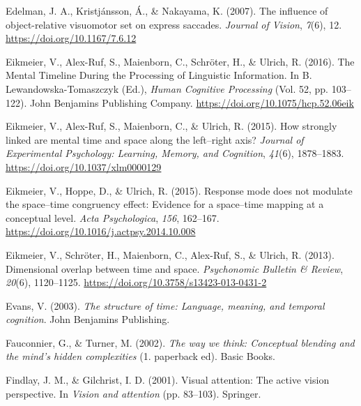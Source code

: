 \documentclass[
  a4paper,12pt,twoside,onecolumn,openright,final,oldfontcommands]{memoir}
\newlength{\cslhangindent}
\newlength{\cslentryspacingunit} %
\newenvironment{CSLReferences}[2] %
 {%
  \setlength{\parindent}{0pt}
  \ifodd #1
  \let\oldpar\par
  \def\par{\hangindent=\cslhangindent\oldpar}
  \fi
  \setlength{\parskip}{#2\cslentryspacingunit}
 }%
 {}
\begin{document}
\begin{CSLReferences}{1}{0}
\leavevmode{}%
Edelman, J. A., Kristjánsson, Á., \& Nakayama, K. (2007). The influence of object-relative visuomotor set on express saccades. \emph{Journal of Vision}, \emph{7}(6), 12. \url{https://doi.org/10.1167/7.6.12}

\leavevmode{}%
Eikmeier, V., Alex-Ruf, S., Maienborn, C., Schröter, H., \& Ulrich, R. (2016). The {Mental} {Timeline} {During} the {Processing} of {Linguistic} {Information}. In B. Lewandowska-Tomaszczyk (Ed.), \emph{Human {Cognitive} {Processing}} (Vol. 52, pp. 103--122). John Benjamins Publishing Company. \url{https://doi.org/10.1075/hcp.52.06eik}

\leavevmode{}%
Eikmeier, V., Alex-Ruf, S., Maienborn, C., \& Ulrich, R. (2015). How strongly linked are mental time and space along the left--right axis? \emph{Journal of Experimental Psychology: Learning, Memory, and Cognition}, \emph{41}(6), 1878--1883. \url{https://doi.org/10.1037/xlm0000129}

\leavevmode{}%
Eikmeier, V., Hoppe, D., \& Ulrich, R. (2015). Response mode does not modulate the space--time congruency effect: {Evidence} for a space--time mapping at a conceptual level. \emph{Acta Psychologica}, \emph{156}, 162--167. \url{https://doi.org/10.1016/j.actpsy.2014.10.008}

\leavevmode{}%
Eikmeier, V., Schröter, H., Maienborn, C., Alex-Ruf, S., \& Ulrich, R. (2013). Dimensional overlap between time and space. \emph{Psychonomic Bulletin \& Review}, \emph{20}(6), 1120--1125. \url{https://doi.org/10.3758/s13423-013-0431-2}

\leavevmode{}%
Evans, V. (2003). \emph{The structure of time: Language, meaning, and temporal cognition}. John Benjamins Publishing.

\leavevmode{}%
Fauconnier, G., \& Turner, M. (2002). \emph{The way we think: Conceptual blending and the mind's hidden complexities} (1. paperback ed). Basic Books.

\leavevmode{}%
Findlay, J. M., \& Gilchrist, I. D. (2001). Visual attention: {The} active vision perspective. In \emph{Vision and attention} (pp. 83--103). Springer.


\end{CSLReferences}
\end{document}
